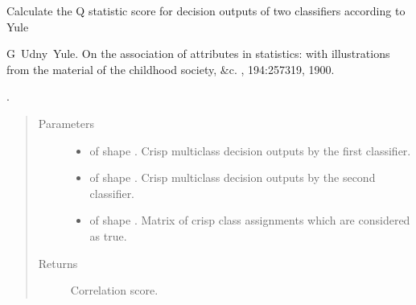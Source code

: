 \documentclass[letterpaper,10pt,english]{sphinxmanual}
\begin{document}
\begin{fulllineitems}
\label{\detokenize{pusion.evaluation.evaluation_metrics:pusion.evaluation.evaluation_metrics.q_statistic}}
\sphinxAtStartPar
Calculate the Q statistic score for decision outputs of two classifiers according to Yule
%
\begin{footnote}[3]\sphinxAtStartFootnote
G Udny Yule. On the association of attributes in statistics: with illustrations from the material of the childhood society, \&c. , 194:257\textendash{}319, 1900.
%
\end{footnote}.

\sphinxAtStartPar

\begin{quote}\begin{description}
\item[{Parameters}] \leavevmode\begin{itemize}
\item {} 
\sphinxAtStartPar
{} \textendash{}  of shape .
Crisp multiclass decision outputs by the first classifier.

\item {} 
\sphinxAtStartPar
{} \textendash{}  of shape .
Crisp multiclass decision outputs by the second classifier.

\item {} 
\sphinxAtStartPar
{} \textendash{}  of shape .
Matrix of crisp class assignments which are considered as true.

\end{itemize}

\item[{Returns}] \leavevmode
\sphinxAtStartPar
Correlation score.

\end{description}\end{quote}

\end{fulllineitems}
\end{document}
